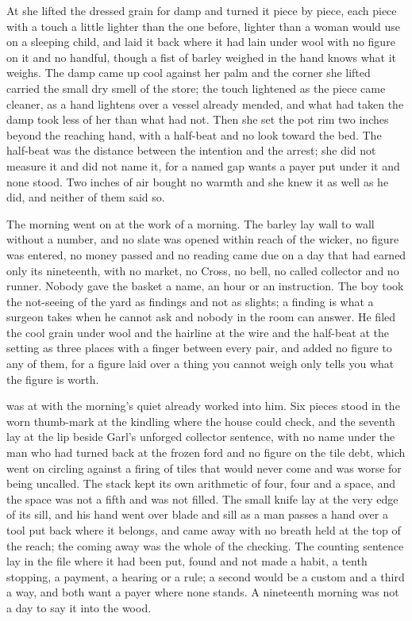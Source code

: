 At  she lifted the dressed grain for damp and turned it piece by piece, each piece with a touch a little lighter than the one before, lighter than a woman would use on a sleeping child, and laid it back where it had lain under wool with no figure on it and no handful, though a fist of barley weighed in the hand knows what it weighs. The damp came up cool against her palm and the corner she lifted carried the small dry smell of the store; the touch lightened as the piece came cleaner, as a hand lightens over a vessel already mended, and what had taken the damp took less of her than what had not. Then she set the pot rim two inches beyond the reaching hand, with a half-beat and no look toward the bed. The half-beat was the distance between the intention and the arrest; she did not measure it and did not name it, for a named gap wants a payer put under it and none stood. Two inches of air bought no warmth and she knew it as well as he did, and neither of them said so.

The morning went on at the work of a morning. The barley lay wall to wall without a number, and no slate was opened within reach of the wicker, no figure was entered, no money passed and no reading came due on a day that had earned only its nineteenth, with no market, no Cross, no bell, no called collector and no runner. Nobody gave the basket a name, an hour or an instruction. The boy took the not-seeing of the yard as findings and not as slights; a finding is what a surgeon takes when he cannot ask and nobody in the room can answer. He filed the cool grain under wool and the hairline at the wire and the half-beat at the setting as three places with a finger between every pair, and added no figure to any of them, for a figure laid over a thing you cannot weigh only tells you what the figure is worth.

\scenebreak

 was at  with the morning's quiet already worked into him. Six pieces stood in the worn thumb-mark at the kindling where the house could check, and the seventh lay at the lip beside Garl's unforged collector sentence, with no name under the man who had turned back at the frozen ford and no figure on the tile debt, which went on circling against a firing of tiles that would never come and was worse for being uncalled. The stack kept its own arithmetic of four, four and a space, and the space was not a fifth and was not filled. The small knife lay at the very edge of its sill, and his hand went over blade and sill as a man passes a hand over a tool put back where it belongs, and came away with no breath held at the top of the reach; the coming away was the whole of the checking. The counting sentence lay in the file where it had been put, found and not made a habit, a tenth stopping, a payment, a hearing or a rule; a second would be a custom and a third a way, and both want a payer where none stands. A nineteenth morning was not a day to say it into the wood.

